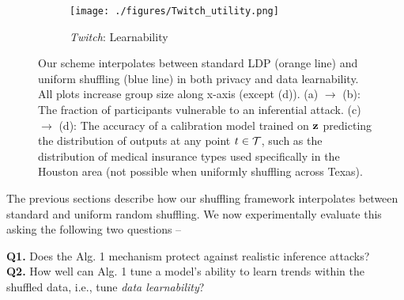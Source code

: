 \begin{figure*}[ht]
    \begin{subfigure}[b]{0.25\linewidth}
        \centering
        \texttt{[image: ./figures/Twitch\_utility.png]}
        \caption{\textit{Twitch}: Learnability}
        \label{fig:Twitch:utility}
    \end{subfigure}
    \vspace{-0.2cm}
   \caption{
   Our scheme interpolates between standard LDP (orange line) and uniform shuffling (blue line) in both privacy and data learnability. All plots increase group size along x-axis (except (d)). 
   (a) $\rightarrow$ (b): The fraction of participants vulnerable to an inferential attack.  
   (c) $\rightarrow$ (d): The accuracy of a calibration model trained on $\mathbf{z}$ predicting the distribution of \ldp outputs at any point $t \in \mathcal{T}$, such as the distribution of medical insurance types used specifically in the Houston area (not possible when uniformly shuffling across Texas). 
   }
   \label{fig:results}
   \vspace{-0.3cm}
\end{figure*}


The previous sections describe how our shuffling framework interpolates between standard \ldp and uniform random shuffling. We now experimentally evaluate this asking the following two questions -- 

\textbf{Q1.} Does the Alg. 1 mechanism protect against realistic inference attacks? \\\textbf{Q2.} How well can Alg. 1 tune a model's ability to learn trends within the shuffled data, i.e., tune \emph{data learnability}?

